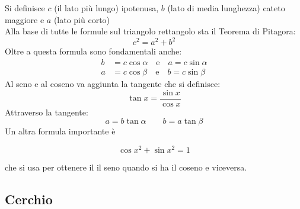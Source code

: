 \begin{center}     
\end{center}
Si definisce $c$ (il lato più lungo) ipotenusa, $b$ (lato di media lunghezza) cateto maggiore e
$a$ (lato più corto)\\
Alla base di tutte le formule sul triangolo rettangolo sta il Teorema di Pitagora:
\begin{equation*}
  c^2=a^2+b^2
\end{equation*}
Oltre a questa formula sono fondamentali anche:
\begin{align*}
  b&=c\cos\alpha\quad\text{e}\quad a=c\sin\alpha\\
  a&=c\cos\beta\quad\text{e}\quad b=c\sin\beta
\end{align*}
Al seno e al coseno va aggiunta la tangente che si definisce:
\begin{equation*}
  \tan x = \frac{\sin x}{\cos x}
\end{equation*}
Attraverso la tangente:
\begin{equation*}
  a=b\tan\alpha \qquad
  b=a \tan\beta
\end{equation*}  
Un altra formula importante è
\vspace{-0.5cm}
\begin{center}
  \begin{equation*}
    \cos{x}^{2}+\sin{x}^{2}=1 
  \end{equation*}
\end{center}
che si usa per ottenere il il seno quando si ha il coseno e viceversa.
\subsection{Cerchio}

